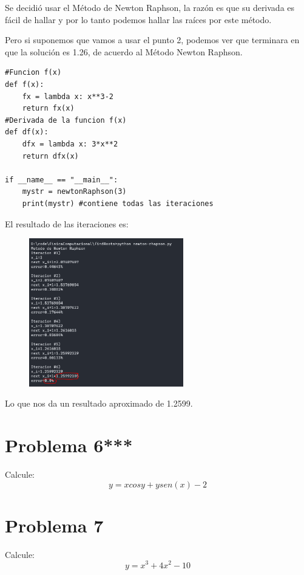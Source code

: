 \documentclass[a4paper,12pt]{article}
\begin{document}
    Se decidió usar 
    el Método de Newton Raphson, la razón es que su derivada es fácil 
    de hallar y por lo tanto
    podemos hallar las raíces por este método.

    Pero si suponemos que vamos a usar el punto 2, podemos ver que terminara en 
    que la solución es 1.26, de acuerdo al Método Newton Raphson.


\begin{lstlisting}
#Funcion f(x)
def f(x):
    fx = lambda x: x**3-2
    return fx(x)
#Derivada de la funcion f(x)
def df(x):
    dfx = lambda x: 3*x**2
    return dfx(x)

if __name__ == "__main__":
    mystr = newtonRaphson(3)
    print(mystr) #contiene todas las iteraciones
\end{lstlisting}
El resultado de las iteraciones es:
\newpage
    \begin{figure}[t]
        \centering
        \includegraphics[width=0.6\textwidth]{f5console.PNG}
    \end{figure}

Lo que nos da un resultado aproximado de 1.2599.

    \section{Problema 6***}
    Calcule:
    \begin{equation}
        y = xcosy + ysen(x) - 2
    \end{equation}
    \newpage
    \section{Problema 7}
    Calcule:
    \begin{equation}
        y = x^3 + 4x^2 - 10
    \end{equation}
\end{document}
